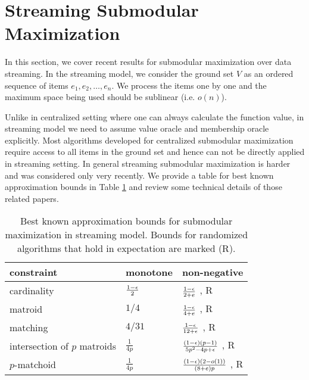 \section{Streaming Submodular Maximization}
\label{sec:streaming}
In this section, we cover recent results for submodular maximization over data streaming. In the streaming model, we consider the ground set $V$ as an ordered sequence of items $e_1, e_2, \ldots, e_n$. We process the items one by one and the maximum space being used should be sublinear (i.e. $o(n)$).


Unlike in centralized setting where one can always calculate the function value, in streaming model we need to assume value oracle and membership oracle explicitly.  Most algorithms developed for centralized submodular maximization require access to all items in the ground set and hence can not be directly applied in streaming setting. In general streaming submodular maximization is harder and was considered only very recently. We provide a table for best known approximation bounds in Table \ref{table:streaming} and review some technical details of those related papers.

\begin{table}[t]
\centering
\begin{tabular}{|l|l|l|}
\hline
constraint & monotone  &  non-negative \\
\hline
cardinality & $\frac{1-\epsilon}{2}$ \cite{BMK+14} & $\frac{1 - \epsilon}{2 + e}$ \cite{CGQ15}, R\\
\hline
matroid & $1/4$ \cite{CK14} & $\frac{1 - \epsilon}{4 + e}$ \cite{CGQ15},  R \\
\hline
matching & $4/31$ \cite{CK14} & $\frac{1 - \epsilon}{12 + \epsilon}$ \cite{CGQ15}, R \\
\hline
intersection of $p$ matroids & $\frac{1}{4p}$ \cite{CK14} & $\frac{(1 - \epsilon)(p - 1)}{5p^2 -4p + \epsilon}$ \cite{CGQ15}, R\\
\hline
$p$-matchoid & $\frac{1}{4p}$ \cite{CGQ15} & $\frac{(1-\epsilon)(2-o(1))}{(8+e)p}$ \cite{CGQ15}, R\\
\hline
\end{tabular}
\caption{Best known approximation bounds for submodular maximization in streaming model. Bounds for randomized algorithms that hold in expectation are marked (R).}
\label{table:streaming}
\end{table}







